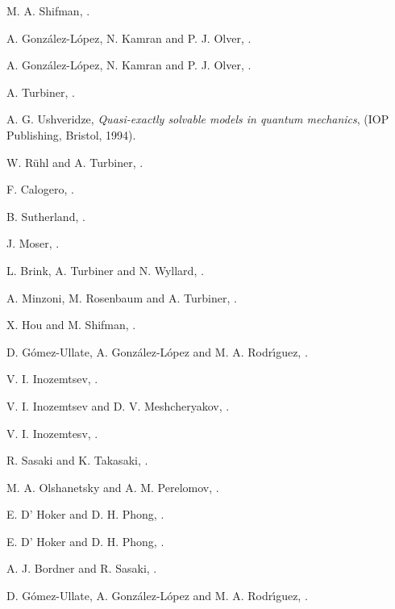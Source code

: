 \documentclass[a4paper,preprint,amsfonts,amssymb,amsmath,%
tightenlines,nofootinbib,noshowpacs]{revtex4}
\begin{document}
\begin{thebibliography}{99}
M. A. Shifman,
.

A. Gonz{\'{a}}lez-L{\'{o}}pez, N. Kamran and P. J. Olver,
.

A. Gonz{\'{a}}lez-L{\'{o}}pez, N. Kamran and P. J. Olver,
.

A. Turbiner,
.

A. G. Ushveridze,
\textit{Quasi-exactly solvable models in quantum mechanics},
(IOP Publishing, Bristol, 1994).

W. R{\"{u}}hl and A. Turbiner,
.

F. Calogero,
.

B. Sutherland,
.

J. Moser,
.

L. Brink, A. Turbiner and N. Wyllard,
.

A. Minzoni, M. Rosenbaum and A. Turbiner,
.

X. Hou and M. Shifman,
.

D. G{\'{o}}mez-Ullate, A. Gonz{\'{a}}lez-L{\'{o}}pez
and M. A. Rodr{\'{\i}}guez,
.

V. I. Inozemtsev,
.

V. I. Inozemtsev and D. V. Meshcheryakov,
.

V. I. Inozemtesv,
.

R. Sasaki and K. Takasaki,
.

M. A. Olshanetsky and A. M. Perelomov,
.

E. D' Hoker and D. H. Phong,
.

E. D' Hoker and D. H. Phong,
.

A. J. Bordner and R. Sasaki,
.

D. G{\'{o}}mez-Ullate, A. Gonz{\'{a}}lez-L{\'{o}}pez
and M. A. Rodr{\'{\i}}guez,
.

\end{thebibliography}
\end{document}
